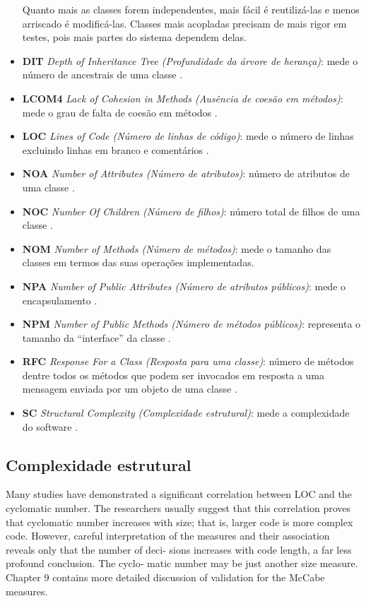 \begin{itemize}
Quanto mais as classes forem independentes, mais fácil é reutilizá-las e menos
arriscado é modificá-las. Classes mais acopladas precisam de mais rigor em
testes, pois mais partes do sistema dependem delas.

  \item {\bf DIT} {\it Depth of Inheritance Tree (Profundidade da árvore de
    herança)}: mede o número de ancestrais de uma classe \cite{Shih1997}.
  \item {\bf LCOM4} {\it Lack of Cohesion in Methods (Ausência de coesão em
    métodos)}: mede o grau de falta de coesão em métodos \cite{Hitz1995}.
  \item {\bf LOC} {\it Lines of Code (Número de linhas de código)}: mede o
    número de linhas excluindo linhas em branco e comentários
    \cite{Lorenz1994}.
  \item {\bf NOA} {\it Number of Attributes (Número de atributos)}: número de
    atributos de uma classe \cite{Kolewe1993}.
  \item {\bf NOC} {\it Number Of Children (Número de filhos)}: número total de
    filhos de uma classe \cite{Rosenberg1997}.
  \item {\bf NOM} {\it Number of Methods (Número de métodos)}: mede o tamanho
    das classes em termos das suas operações implementadas.
  \item {\bf NPA} {\it Number of Public Attributes (Número de atributos
    públicos)}: mede o encapsulamento \cite{Jagdish1997}.
  \item {\bf NPM} {\it Number of Public Methods (Número de métodos públicos)}:
    representa o tamanho da ``interface'' da classe \cite{Jagdish1997}.
  \item {\bf RFC} {\it Response For a Class (Resposta para uma classe)}:
    número de métodos dentre todos os métodos que podem ser invocados em
    resposta a uma mensagem enviada por um objeto de uma classe
    \cite{Sharble1993}.
  \item {\bf SC} {\it Structural Complexity (Complexidade estrutural)}: mede a
    complexidade do software \cite{Darcy2005}.
\end{itemize}

\subsection{Complexidade estrutural} \label{complexidade}

Many studies have demonstrated a significant correlation between
LOC and the cyclomatic number. The researchers usually suggest that
this correlation proves that cyclomatic number increases with size; that
is, larger code is more complex code. However, careful interpretation of
the measures and their association reveals only that the number of deci-
sions increases with code length, a far less profound conclusion. The cyclo-
matic number may be just another size measure. Chapter 9 contains more
detailed discussion of validation for the McCabe measures.

